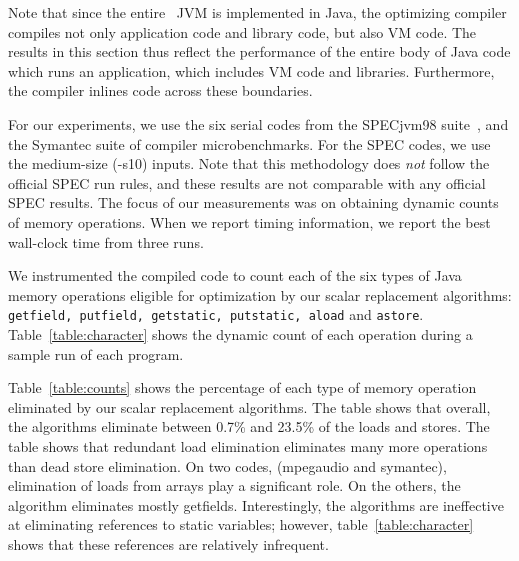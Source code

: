 Note that since the entire \jp\ JVM is implemented in Java, the optimizing
compiler compiles not only application code and library code, but also
VM code.  The results in this section thus reflect the performance
of the entire body of Java code which runs an application, which includes
VM code and libraries. Furthermore, the compiler inlines code across
these boundaries.

For our experiments, we use the six serial codes from the 
SPECjvm98 suite~\cite{specJVM98}, and the Symantec suite of 
compiler microbenchmarks.  For the SPEC codes, we use the
medium-size (-s10) inputs.  Note that this methodology does {\em not}
follow the official SPEC run rules, and these results are not
comparable with any official SPEC results.  
The focus of our measurements was on obtaining dynamic counts
of memory operations.
When we report timing
information, we report the best wall-clock time from three runs.


We instrumented the compiled code to count each of the six types of Java memory
operations eligible for optimization by our scalar replacement
algorithms: {\tt getfield, putfield, getstatic, putstatic, aload} and 
{\tt astore}.  Table~\ref{table:character} shows the dynamic count of
each operation during a sample run of each program.


Table~\ref{table:counts} shows the percentage of each type of memory
operation eliminated by our scalar replacement algorithms.  
The table shows that
overall, the algorithms eliminate between 0.7\% and 23.5\% of the
loads and stores.  The table shows that redundant load elimination
eliminates many more operations than dead store elimination.  On two
codes, (mpegaudio and symantec), elimination of loads from arrays play
a significant role.  On the others, the algorithm eliminates mostly
getfields.  Interestingly, the algorithms are ineffective at eliminating
references to static variables; however, table~\ref{table:character} shows
that these references are relatively infrequent.


